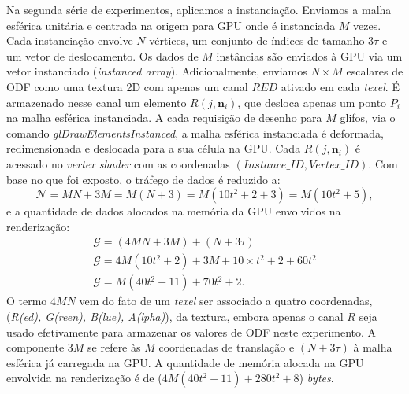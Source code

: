 Na segunda série de experimentos, aplicamos a instanciação. Enviamos a malha esférica unitária e centrada na origem para GPU onde é instanciada $M$ vezes. Cada instanciação envolve $N$ vértices, um conjunto de índices de tamanho $3\tau$ e um vetor de deslocamento. Os dados de $M$ instâncias são enviados à GPU via um vetor instanciado (\textit{instanced array}). Adicionalmente, enviamos $N\times M$ escalares de ODF como uma textura 2D com apenas um canal $RED$ ativado em cada \textit{texel}. É armazenado nesse canal um elemento $R(j, \mathbf{n}_i)$, que desloca apenas um ponto $P_i$ na malha esférica instanciada. A cada requisição de desenho para $M$ glifos, via o comando \textit{glDrawElementsInstanced},
a malha esférica instanciada é deformada, redimensionada e deslocada para a sua célula na GPU. Cada $R(j, \mathbf{n}_i)$ 
é acessado no \textit{vertex shader} com as coordenadas $(Instance\_ID, Vertex\_ID)$. Com base no que foi exposto, o tráfego de dados é reduzido a:
\begin{equation}
\label{eq::mem_odfs_trafego_2.1}
    \mathscr{N} =  MN + 3M = M(N+3) = M(10 t^2 + 2 + 3) = M(10t^2 + 5),
\end{equation}
e a quantidade de dados alocados na memória da GPU envolvidos na renderização:
\begin{equation}
\label{eq::mem_odfs_ocupancia_2.1}
\begin{array}{l}
    \mathscr{G} =  (4MN + 3M) + (N + 3\tau) \\
    \mathscr{G} = 4M(10t^2+2) + 3M + 10\times t^2 + 2 + 60t^2 \\
    \mathscr{G} = M(40t^2 + 11) + 70t^2 + 2 .
    \end{array}
\end{equation}
O termo $4MN$ vem do fato de um \textit{texel} ser associado a quatro coordenadas, (\textit{R(ed), G(reen), B(lue), A(lpha)}), da textura, embora apenas o canal $R$ seja usado efetivamente para armazenar os valores de ODF neste experimento. A componente $3M$ se refere às $M$ coordenadas de translação e $(N + 3\tau)$ à malha esférica já carregada na GPU. A quantidade de memória alocada na GPU envolvida na renderização é de ($4M(40t^2 + 11) + 280t^2 + 8$) \textit{bytes}.

